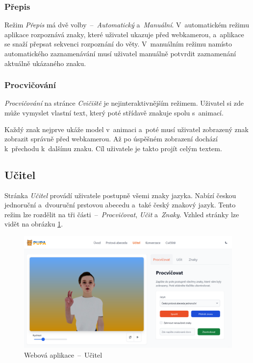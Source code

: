 \documentclass[
  master,
  program=ainfvs,
  biblatex,
  figures=true,
  tables=false,
  sourcecodes=true,
  glossaries,
  index
]{kidiplom}
\begin{document}
        \subsubsection{Přepis}
            Režim \emph{Přepis} má dvě volby~--~\emph{Automatický} a~\emph{Manuální}. V~automatickém režimu aplikace rozpoznává znaky, které uživatel ukazuje před webkamerou, a~aplikace se snaží přepsat sekvenci rozpoznání do věty. V~manuálním režimu namísto automatického zaznamenávání musí uživatel manuálně potvrdit zaznamenání aktuálně ukázaného znaku.
        
        \subsubsection{Procvičování}
            \emph{Procvičování} na stránce \emph{Cvičiště} je nejinteraktivnějším režimem. Uživatel si zde může vymyslet vlastní text, který poté střídavě znakuje spolu s~animací. 
            
            Každý znak nejprve ukáže model v~animaci a~poté musí uživatel zobrazený znak zobrazit správně před webkamerou. Až po úspěšném zobrazení dochází k~přechodu k~dalšímu znaku. Cíl uživatele je takto projít celým textem.
        
    \subsection{Učitel}
        Stránka \emph{Učitel} provádí uživatele postupně všemi znaky jazyka. Nabízí českou jednoruční a~dvouruční prstovou abecedu a~také český znakový jazyk. Tento režim lze rozdělit na tři části~--~\emph{Procvičovat}, \emph{Učit} a~\emph{Znaky}. Vzhled stránky lze vidět na obrázku \ref{ucitel}.

         \begin{figure}[htbp]
                \centering
                \includegraphics[width=1\columnwidth]{graphics/ucitel.png}
                \caption{Webová aplikace~--~Učitel}
                \label{ucitel}
            \end{figure}
\end{document}
